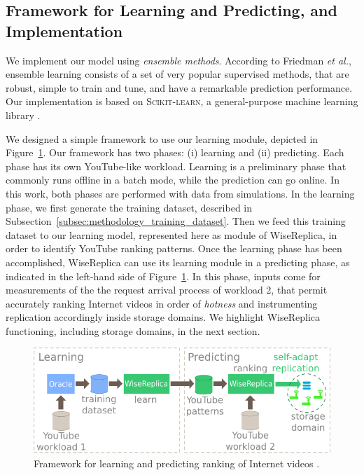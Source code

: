 \subsection{Framework for Learning and Predicting, and Implementation}
\label{subsec:framework}

We implement our model using \emph{ensemble methods}. According to Friedman \emph{et al.}, ensemble learning consists of a set of very popular supervised methods, that are robust, simple to train and tune, and have a remarkable prediction performance. Our implementation is based on \textsc{Scikit-learn}, a general-purpose machine learning library \cite{scikit-learn}. 

We designed a simple framework to use our learning module, depicted in Figure~\ref{fig:model_scenario}. Our framework has two phases: (i) learning and (ii) predicting. Each phase has its own YouTube-like workload. Learning is a preliminary phase that commonly runs offline in a batch mode, while the prediction can go online. In this work, both phases are performed with data from simulations. In the learning phase, we first generate the training dataset, described in Subsection~\ref{subsec:methodology_training_dataset}. Then we feed this training dataset to our learning model, represented here as module of WiseReplica, in order to identify YouTube ranking patterns. Once the learning phase has been accomplished, WiseReplica can use its learning module in a predicting phase, as indicated in the left-hand side of Figure~\ref{fig:model_scenario}. In this phase, inputs come for measurements of the the request arrival process of workload 2, that permit accurately ranking Internet videos in order of \emph{hotness} and instrumenting replication accordingly inside storage domains. We highlight WiseReplica functioning, including storage domains, in the next section.

\begin{figure}
  \centering
     \includegraphics[width=.65\textwidth]{inputs/img/wisereplica_scheme}
  \caption{Framework for learning and predicting ranking of Internet videos .}
  \label{fig:model_scenario}
\end{figure}
